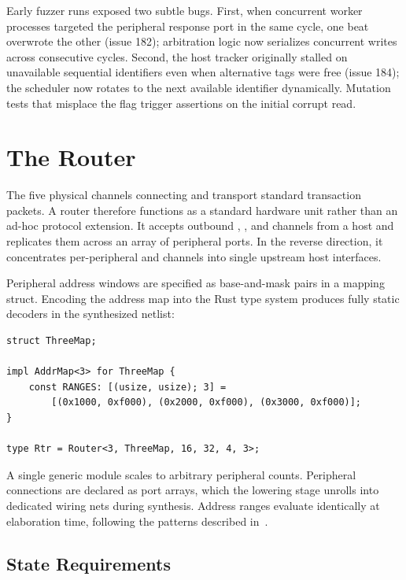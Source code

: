 \documentclass[journal,9pt]{IEEEtran}
\begin{document}
Early fuzzer runs exposed two subtle bugs. First, when concurrent worker
processes targeted the peripheral response port in the same cycle, one beat
overwrote the other (issue 182); arbitration logic now serializes concurrent
writes across consecutive cycles. Second, the host tracker originally stalled
on unavailable sequential identifiers even when alternative tags were free
(issue 184); the scheduler now rotates to the next available identifier
dynamically. Mutation tests that misplace the  flag trigger
assertions on the initial corrupt read.

\section{The Router}
\label{sec:a-routing}

The five physical channels connecting  and 
transport standard transaction packets. A router therefore functions as a
standard hardware unit rather than an ad-hoc protocol extension. It accepts
outbound , , and  channels from a host and
replicates them across an array of peripheral ports. In the reverse
direction, it concentrates per-peripheral  and  channels
into single upstream host interfaces.

Peripheral address windows are specified as base-and-mask pairs in a mapping
struct. Encoding the address map into the Rust type system produces fully
static decoders in the synthesized netlist:

\begin{lstlisting}
struct ThreeMap;

impl AddrMap<3> for ThreeMap {
    const RANGES: [(usize, usize); 3] =
        [(0x1000, 0xf000), (0x2000, 0xf000), (0x3000, 0xf000)];
}

type Rtr = Router<3, ThreeMap, 16, 32, 4, 3>;
\end{lstlisting}

A single generic module scales to arbitrary peripheral counts. Peripheral
connections are declared as port arrays, which the lowering stage unrolls
into dedicated wiring nets during synthesis. Address ranges evaluate
identically at elaboration time, following the  patterns
described in~\cite{examples}.

\subsection*{State Requirements}
\end{document}
